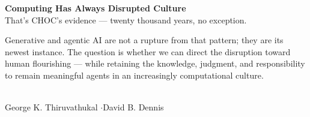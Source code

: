 \documentclass[10pt,aspectratio=1610]{beamer}
\newcommand{\lead}[1]{{\color{gktaccent2}#1}}
\begin{document}
\begin{frame}[plain]
\centering
{\Large\bfseries\color{gktaccent}Computing Has Always Disrupted Culture}\\[1em]
\lead{\normalsize That's CHOC's evidence --- twenty thousand years, no exception.}\\[1em]
\begin{minipage}{0.85\textwidth}
\normalsize Generative and agentic AI are not a rupture from that pattern; they are its newest instance. The question is whether we can direct the disruption toward human flourishing --- while retaining the knowledge, judgment, and responsibility to remain meaningful agents in an increasingly computational culture.
\end{minipage}\\[1.4em]
{\normalsize George K. Thiruvathukal \quad$\cdot$\quad David B. Dennis}
\end{frame}
\end{document}
